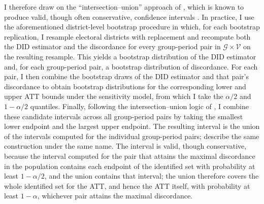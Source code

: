 \documentclass[twoside,11pt]{article}
\begin{document}
I therefore draw on the ``intersection--union'' approach of \citet{bergerhsu1996}, which is known to produce valid, though often conservative, confidence intervals \citep[see][pp.~2262--2264, who document the conservativeness of this approach for bounds of the same form and propose a less conservative bootstrap]{yeetal2024}. In practice, I use the aforementioned district-level bootstrap procedure in which, for each bootstrap replication, I resample electoral districts with replacement and recompute both the DID estimator and the discordance for every group-period pair in $\mathcal{G} \times \mathcal{V}$ on the resulting resample. This yields a bootstrap distribution of the DID estimator and, for each group-period pair, a bootstrap distribution of discordance. For each pair, I then combine the bootstrap draws of the DID estimator and that pair's discordance to obtain bootstrap distributions for the corresponding lower and upper ATT bounds under the sensitivity model, from which I take the $\alpha/2$ and $1-\alpha/2$ quantiles. Finally, following the intersection–union logic of \citet{bergerhsu1996}, I combine these candidate intervals across all group-period pairs by taking the smallest lower endpoint and the largest upper endpoint. The resulting interval is the union of the intervals computed for the individual group-period pairs; \citet[][pp.~2262--2263]{yeetal2024} describe the same construction under the same name. The interval is valid, though conservative, because the interval computed for the pair that attains the maximal discordance in the population contains each endpoint of the identified set with probability at least $1 - \alpha/2$, and the union contains that interval; the union therefore covers the whole identified set for the \textrm{ATT}, and hence the \textrm{ATT} itself, with probability at least $1 - \alpha$, whichever pair attains the maximal discordance.
\end{document}
